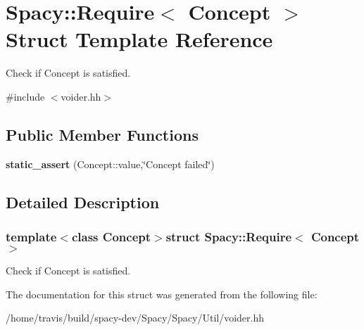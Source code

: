 \hypertarget{structSpacy_1_1Require}{\section{\-Spacy\-:\-:\-Require$<$ \-Concept $>$ \-Struct \-Template \-Reference}
\label{structSpacy_1_1Require}
}


\-Check if \-Concept is satisfied.  




{\ttfamily \#include $<$voider.\-hh$>$}

\subsection*{\-Public \-Member \-Functions}
\begin{DoxyCompactItemize}
\item 
\hypertarget{structSpacy_1_1Require_ada4f39acd5fc1327617a3c1e4ad8b79f}{{\bfseries static\-\_\-assert} (\-Concept\-::value,\char`\"{}\-Concept failed\char`\"{})}\label{structSpacy_1_1Require_ada4f39acd5fc1327617a3c1e4ad8b79f}

\end{DoxyCompactItemize}


\subsection{\-Detailed \-Description}
\subsubsection*{template$<$class Concept$>$struct Spacy\-::\-Require$<$ Concept $>$}

\-Check if \-Concept is satisfied. 

\-The documentation for this struct was generated from the following file\-:\begin{DoxyCompactItemize}
\item 
/home/travis/build/spacy-\/dev/\-Spacy/\-Spacy/\-Util/voider.\-hh\end{DoxyCompactItemize}
